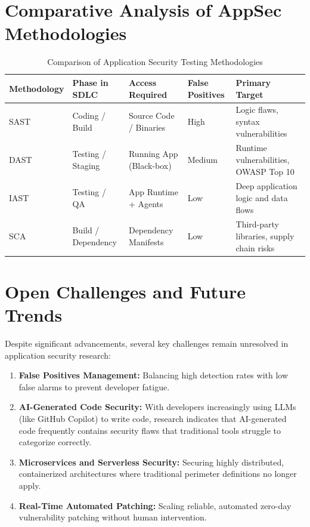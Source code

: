 \documentclass[11pt,a4paper]{article}
\begin{document}
\section{Comparative Analysis of AppSec Methodologies}
\begin{table}[htbp]
\centering
\caption{Comparison of Application Security Testing Methodologies}
\begin{tabular}{p{2.5cm} p{2cm} p{3cm} p{2cm} p{3.5cm}}
\hline
\textbf{Methodology} & \textbf{Phase in SDLC} & \textbf{Access Required} & \textbf{False Positives} & \textbf{Primary Target} \\
\hline
SAST & Coding / Build & Source Code / Binaries & High & Logic flaws, syntax vulnerabilities \\
DAST & Testing / Staging & Running App (Black-box) & Medium & Runtime vulnerabilities, OWASP Top 10 \\
IAST & Testing / QA & App Runtime + Agents & Low & Deep application logic and data flows \\
SCA & Build / Dependency & Dependency Manifests & Low & Third-party libraries, supply chain risks \\
\hline
\end{tabular}
\end{table}

\section{Open Challenges and Future Trends}
Despite significant advancements, several key challenges remain unresolved in application security research:
\begin{enumerate}
    \item \textbf{False Positives Management:} Balancing high detection rates with low false alarms to prevent developer fatigue.
    \item \textbf{AI-Generated Code Security:} With developers increasingly using LLMs (like GitHub Copilot) to write code, research indicates that AI-generated code frequently contains security flaws that traditional tools struggle to categorize correctly.
    \item \textbf{Microservices and Serverless Security:} Securing highly distributed, containerized architectures where traditional perimeter definitions no longer apply.
    \item \textbf{Real-Time Automated Patching:} Scaling reliable, automated zero-day vulnerability patching without human intervention.
\end{enumerate}
\end{document}

